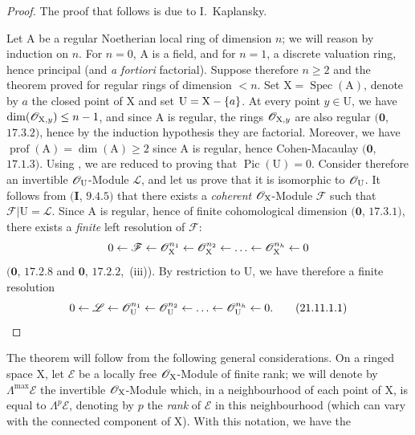 \begin{proof}
The proof that follows is due to I.~Kaplansky.

Let $\mathrm{A}$ be a regular Noetherian local ring of dimension $n$; we will reason by induction on $n$.
For $n=0$, $\mathrm{A}$ is a field, and for $n=1$, a discrete valuation ring, hence principal (and \emph{a fortiori} factorial).
Suppose therefore $n\geq 2$ and the theorem proved for regular rings of dimension $<n$.
Set $\mathrm{X}=\operatorname{Spec}(\mathrm{A})$, denote by $a$ the closed point of $\mathrm{X}$ and set $\mathrm{U}=\mathrm{X}-\{a\}$.
At every point $y\in\mathrm{U}$, we have $\dim(\mathscr{O}_{\mathrm{X},y})\leq n- 1$, and since $\mathrm{A}$ is regular, the rings $\mathscr{O}_{\mathrm{X},y}$ are also regular $(\mathbf{0}$, $17.3.2)$, hence by the induction hypothesis they are factorial.
Moreover, we have $\operatorname{prof}(\mathrm{A})=\dim(\mathrm{A})\geq 2$ since $\mathrm{A}$ is regular, hence Cohen-Macaulay $(\mathbf{0}$, $17.1.3)$.
Using , we are reduced to proving that $\operatorname{Pic}(\mathrm{U})=0$.
Consider therefore an invertible $\mathscr{O}_{\mathrm{U}}$-Module $\mathscr{L}$, and let us prove that it is isomorphic to $\mathscr{O}_{\mathrm{U}}$.
It follows from $(\mathbf{I}$, $9.4.5)$ that there exists a \emph{coherent} $\mathscr{O}_{\mathrm{X}}$-Module $\mathscr{F}$ such that $\mathscr{F}|\mathrm{U}=\mathscr{L}$.
Since $\mathrm{A}$ is regular, hence of finite cohomological dimension $(\mathbf{0}$, $17.3.1)$, there exists a \emph{finite} left resolution of $\mathscr{F}$:
\[
  0\leftarrow\mathscr{F}\leftarrow\mathscr{O}_{\mathrm{X}}^{n_1}\leftarrow\mathscr{O}_{\mathrm{X}}^{n_2}\leftarrow\ldots\leftarrow\mathscr{O}_{\mathrm{X}}^{n_h}\leftarrow 0
\]
$(\mathbf{0}$, $17.2.8$ and $\mathbf{0}$, $17.2.2$,~(iii)).
By restriction to $\mathrm{U}$, we have therefore a finite resolution
\[
\label{IV.21.11.1.1}
  0\leftarrow\mathscr{L}\leftarrow\mathscr{O}_{\mathrm{U}}^{n_1}\leftarrow\mathscr{O}_{\mathrm{U}}^{n_2}\leftarrow\ldots\leftarrow\mathscr{O}_{\mathrm{U}}^{n_h}\leftarrow 0.
  \tag{21.11.1.1}
\]
\end{proof}

The theorem will follow from the following general considerations.
On a ringed space $\mathrm{X}$, let $\mathscr{E}$ be a locally free $\mathscr{O}_{\mathrm{X}}$-Module of finite rank; we will denote by $\Lambda^{\max}\mathscr{E}$ the invertible $\mathscr{O}_{\mathrm{X}}$-Module which, in a neighbourhood of each point of $\mathrm{X}$, is equal to $\Lambda^p\mathscr{E}$, denoting by $p$ the \emph{rank} of $\mathscr{E}$ in this neighbourhood (which can vary with the connected component of $\mathrm{X}$).
With this notation, we have the

